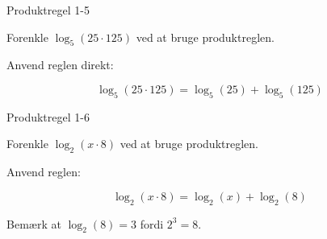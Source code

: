 \documentclass{article}
\begin{document}
\newpage

\begin{exercise}{Produktregel 1-5}

Forenkle $\log_5(25 \cdot 125)$ ved at bruge produktreglen.


\hint

Anvend reglen direkt:

\hint
\[
\log_5(25 \cdot 125) = \log_5(25) + \log_5(125)
\]

\end{exercise}

\newpage

\begin{exercise}{Produktregel 1-6}

Forenkle $\log_2(x \cdot 8)$ ved at bruge produktreglen.


\hint

Anvend reglen:

\hint
\[
\log_2(x \cdot 8) = \log_2(x) + \log_2(8)
\]

\hint

Bemærk at $\log_2(8) = 3$ fordi $2^3 = 8$.

\end{exercise}
\end{document}
